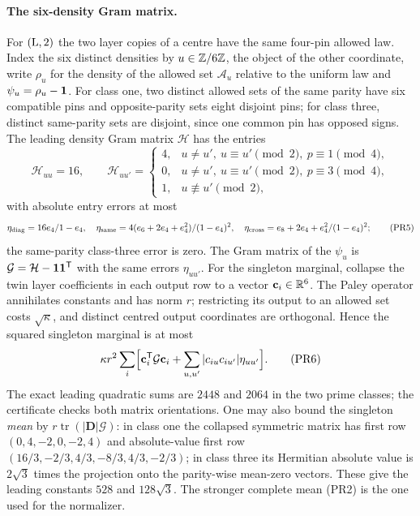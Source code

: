 \paragraph{The six-density Gram matrix.}
For $({\rm L},2)$ the two layer copies of a centre have the same four-pin allowed law.
Index the six distinct densities by $u\in\Zsix$, the object of the other coordinate,
write $\rho_u$ for the density of the allowed set $\mathcal A_u$ relative to the
uniform law and $\psi_u=\rho_u-\one$. For class one, two distinct allowed sets of the
same parity have six compatible pins and opposite-parity sets eight disjoint pins; for
class three, distinct same-parity sets are disjoint, since one common pin has opposed
signs. The leading density Gram matrix $\mathcal H$ has the entries
\[
 \mathcal H_{uu}=16,\qquad \mathcal H_{uu'}=\begin{cases}
 4,&u\ne u',\ u\equiv u'\pmod2,\ p\equiv1\pmod4,\\
 0,&u\ne u',\ u\equiv u'\pmod2,\ p\equiv3\pmod4,\\
 1,&u\not\equiv u'\pmod2,\end{cases}
\]
with absolute entry errors at most
\[
 \eta_{\rm diag}=\frac{16e_4}{1-e_4},\quad
 \eta_{\rm same}=\frac{4(e_6+2e_4+e_4^2)}{(1-e_4)^2},\quad
 \eta_{\rm cross}=\frac{e_8+2e_4+e_4^2}{(1-e_4)^2};\tag{PR5}
\]
the same-parity class-three error is zero. The Gram matrix of the $\psi_u$ is
$\mathcal G=\mathcal H-\one\one^{\mathsf T}$ with the same errors $\eta_{uu'}$. For the
singleton marginal, collapse the twin layer coefficients in each output row to a vector
$\mathbf c_i\in\R^6$. The Paley operator annihilates constants and has norm $r$;
restricting its output to an allowed set costs $\sqrt\kappa$, and distinct centred
output coordinates are orthogonal. Hence the squared singleton marginal is at most
\[
 \kappa r^2\sum_i\Bigl[\mathbf c_i^{\mathsf T}\mathcal G\mathbf c_i
 +\sum_{u,u'}|c_{iu}c_{iu'}|\eta_{uu'}\Bigr].\tag{PR6}
\]
The exact leading quadratic sums are $2448$ and $2064$ in the two prime classes; the
certificate checks both matrix orientations. One may also bound the singleton
\emph{mean} by $r\operatorname{tr}(|\mathbf D|\mathcal G)$: in class one the collapsed
symmetric matrix has first row $(0,4,-2,0,-2,4)$ and absolute-value first row
$(16/3,-2/3,4/3,-8/3,4/3,-2/3)$; in class three its Hermitian absolute value is
$2\sqrt3$ times the projection onto the parity-wise mean-zero vectors. These give the
leading constants $528$ and $128\sqrt3$. The stronger complete mean (PR2) is the one
used for the normalizer.

